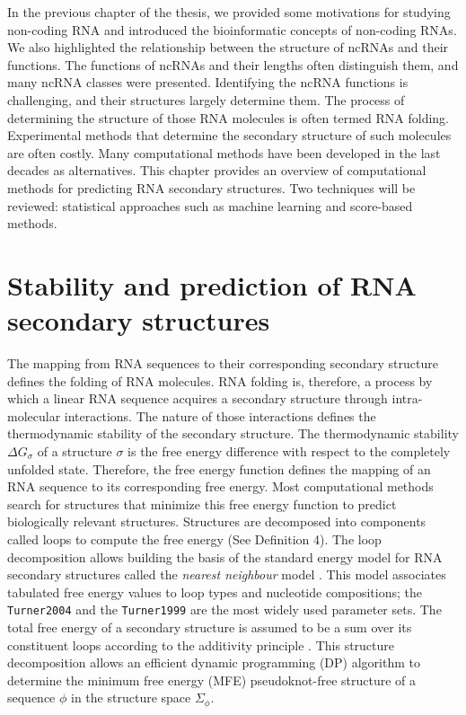  In the previous chapter of the thesis, we provided some motivations for studying non-coding RNA and introduced the bioinformatic concepts of non-coding RNAs. We also highlighted the relationship between the structure of ncRNAs and their functions. The functions of ncRNAs and their lengths often distinguish them, and many ncRNA classes were presented. Identifying the ncRNA functions is challenging, and their structures largely determine them. The process of determining the structure of those RNA molecules is often termed RNA folding. Experimental methods that determine the secondary structure of such molecules are often costly. Many computational methods have been developed in the last decades as alternatives. This chapter provides an overview of computational methods for predicting RNA secondary structures. Two techniques will be reviewed: statistical approaches such as machine learning and score-based methods.

\section{Stability and prediction of RNA secondary structures}

The mapping from RNA sequences to their corresponding secondary structure defines the folding of RNA molecules. RNA folding is, therefore, a process by which a linear RNA sequence acquires a secondary structure through intra-molecular interactions. The nature of those interactions defines the thermodynamic stability of the secondary structure. The thermodynamic stability $\Delta G_{\sigma}$ of a structure $\sigma$ is the free energy difference with respect to the completely unfolded state. Therefore, the free energy function defines the mapping of an RNA sequence to its corresponding free energy.
Most computational methods search for structures that minimize this free energy function to predict biologically relevant structures. Structures are decomposed into components called loops to compute the free energy (See Definition 4). The loop decomposition allows building the basis of the standard energy model for RNA secondary structures called the \textit{nearest neighbour} model \cite{turner09_nndb}. This model associates tabulated free energy values to loop types and nucleotide compositions; the \texttt{Turner2004} \cite{mathews2004incorporating}  and the \texttt{Turner1999} \cite{mathews1999expanded} are the most widely used parameter sets.  The total free energy of a secondary structure is assumed to be a sum over its constituent loops according to the additivity principle \cite{dill97_addit_princ_bioch}. This structure decomposition allows an efficient dynamic programming (DP) algorithm to determine the minimum free energy (MFE) pseudoknot-free structure of a sequence $\phi$ in the structure space $\Sigma_{\phi}$. 

